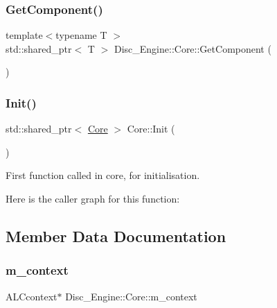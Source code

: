 \subsubsection{\texorpdfstring{Get\+Component()}{GetComponent()}}
{\footnotesize\ttfamily template$<$typename T $>$ \\
std\+::shared\+\_\+ptr$<$ T $>$ Disc\+\_\+\+Engine\+::\+Core\+::\+Get\+Component (\begin{DoxyParamCaption}{ }\end{DoxyParamCaption})\hspace{0.3cm}{\ttfamily [inline]}}

\mbox{\label{class_disc___engine_1_1_core_a4c071496806fdf473780da441945518e}} 
\subsubsection{\texorpdfstring{Init()}{Init()}}
{\footnotesize\ttfamily std\+::shared\+\_\+ptr$<$ \mbox{\hyperlink{class_disc___engine_1_1_core}{Core}} $>$ Core\+::\+Init (\begin{DoxyParamCaption}{ }\end{DoxyParamCaption})\hspace{0.3cm}{\ttfamily [static]}}



First function called in core, for initialisation. 

Here is the caller graph for this function\+:


\subsection{Member Data Documentation}
\mbox{\label{class_disc___engine_1_1_core_aa4c676736bedf5986cfd42da78d301bc}} 
\subsubsection{\texorpdfstring{m\+\_\+context}{m\_context}}
{\footnotesize\ttfamily A\+L\+Ccontext$\ast$ Disc\+\_\+\+Engine\+::\+Core\+::m\+\_\+context\hspace{0.3cm}{\ttfamily [private]}}

